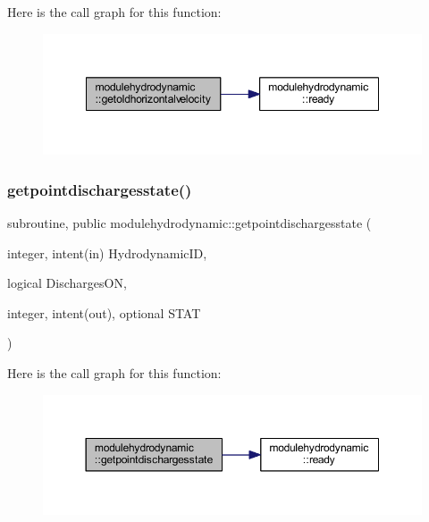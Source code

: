 Here is the call graph for this function\+:\nopagebreak
\begin{figure}[H]
\begin{center}
\leavevmode
\includegraphics[width=348pt]{namespacemodulehydrodynamic_a7161ffc34f27ea1c9e5f1f9bdc165d07_cgraph}
\end{center}
\end{figure}
\mbox{\label{namespacemodulehydrodynamic_a6ebc590498ef2108834cad47a70d1f3a}} 
\subsubsection{\texorpdfstring{getpointdischargesstate()}{getpointdischargesstate()}}
{\footnotesize\ttfamily subroutine, public modulehydrodynamic\+::getpointdischargesstate (\begin{DoxyParamCaption}\item[{integer, intent(in)}]{Hydrodynamic\+ID,  }\item[{logical}]{Discharges\+ON,  }\item[{integer, intent(out), optional}]{S\+T\+AT }\end{DoxyParamCaption})}

Here is the call graph for this function\+:\nopagebreak
\begin{figure}[H]
\begin{center}
\leavevmode
\includegraphics[width=350pt]{namespacemodulehydrodynamic_a6ebc590498ef2108834cad47a70d1f3a_cgraph}
\end{center}
\end{figure}
\mbox{\label{namespacemodulehydrodynamic_a5e97af02320deab67308d99bcf2745e1}} 
